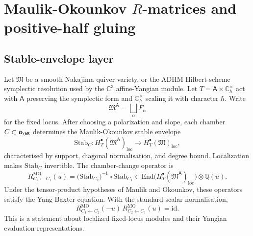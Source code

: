 \providecommand{\Hom}{\mathrm{Hom}}
\providecommand{\End}{\mathrm{End}}
\providecommand{\Ext}{\mathrm{Ext}}
\providecommand{\Spec}{\mathrm{Spec}}
\providecommand{\Db}{D^{b}}
\providecommand{\CoHA}{\mathrm{CoHA}}
\providecommand{\Jac}{\mathrm{Jac}}
\providecommand{\Rep}{\mathrm{Rep}}
\providecommand{\Stab}{\mathrm{Stab}}
\providecommand{\Sym}{\mathrm{Sym}}
\providecommand{\Res}{\mathrm{Res}}
\providecommand{\Hilb}{\mathrm{Hilb}}
\providecommand{\bC}{\mathbb C}
\providecommand{\bN}{\mathbb N}
\providecommand{\bP}{\mathbb P}
\providecommand{\bZ}{\mathbb Z}
\providecommand{\bQ}{\mathbb Q}
\providecommand{\sN}{\mathcal N}
\providecommand{\sH}{\mathcal H}
\providecommand{\fa}{\mathfrak a}
\providecommand{\fg}{\mathfrak g}
\providecommand{\fgl}{\mathfrak{gl}}

\section*{Maulik-Okounkov \(R\)-matrices and positive-half gluing}

\subsection*{Stable-envelope layer}

Let \(\mathfrak M\) be a smooth Nakajima quiver variety, or the ADHM
Hilbert-scheme symplectic resolution used by the \(\bC^3\) affine-Yangian
module. Let \(T=\mathsf A\times\bC_{\hbar}^{\times}\) act with
\(\mathsf A\) preserving the symplectic form and \(\bC_{\hbar}^{\times}\)
scaling it with character \(\hbar\). Write
\[
  \mathfrak M^{\mathsf A}=\bigsqcup_{\alpha}F_{\alpha}
\]
for the fixed locus. After choosing a polarization and slope, each
chamber \(C\subset\fa_{\bR}\) determines the Maulik-Okounkov stable
envelope
\[
  \Stab_C\colon
  H_T^\bullet(\mathfrak M^{\mathsf A})_{\mathrm{loc}}
  \longrightarrow
  H_T^\bullet(\mathfrak M)_{\mathrm{loc}},
\]
characterised by support, diagonal normalisation, and degree bound.
Localization makes \(\Stab_C\) invertible. The chamber-change operator is
\[
  R^{\mathrm{MO}}_{C_2\leftarrow C_1}(u)
  =
  \bigl(\Stab_{C_2}\bigr)^{-1}\circ\Stab_{C_1}
  \in
  \End\bigl(H_T^\bullet(\mathfrak M^{\mathsf A})_{\mathrm{loc}}\bigr)
  \otimes\bQ(u).
\]
Under the tensor-product hypotheses of Maulik and Okounkov, these operators
satisfy the Yang-Baxter equation. With the standard scalar
normalisation,
\[
  R^{\mathrm{MO}}_{C_1\leftarrow C_2}(-u)\,
  R^{\mathrm{MO}}_{C_2\leftarrow C_1}(u)=\mathrm{id}.
\]
This is a statement about localized fixed-locus modules and their
Yangian evaluation representations.

